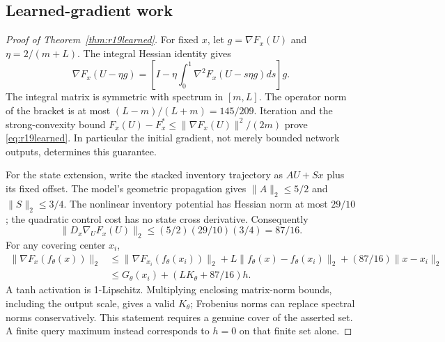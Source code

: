 \subsection{Learned-gradient work}
\begin{proof}[Proof of Theorem~\ref{thm:r19learned}]
For fixed $x$, let $g=\nabla F_x(U)$ and $\eta=2/(m+L)$. The integral Hessian identity gives
\[
 \nabla F_x(U-\eta g)=
 \left[I-\eta\int_0^1\nabla^2F_x(U-s\eta g)ds\right]g.
\]
The integral matrix is symmetric with spectrum in $[m,L]$. The operator norm of the bracket is at most $(L-m)/(L+m)=145/209$. Iteration and the strong-convexity bound $F_x(U)-F_x^*\leq\|\nabla F_x(U)\|^2/(2m)$ prove \eqref{eq:r19learned}. In particular the initial gradient, not merely bounded network outputs, determines this guarantee.

For the state extension, write the stacked inventory trajectory as $AU+Sx$ plus its fixed offset. The model's geometric propagation gives $\|A\|_2\leq5/2$ and $\|S\|_2\leq3/4$. The nonlinear inventory potential has Hessian norm at most $29/10$; the quadratic control cost has no state cross derivative. Consequently
\[
 \|D_x\nabla_UF_x(U)\|_2
 \leq(5/2)(29/10)(3/4)=87/16.
\]
For any covering center $x_i$,
\begin{align*}
 \|\nabla F_x(f_\theta(x))\|_2
 &\leq\|\nabla F_{x_i}(f_\theta(x_i))\|_2
       +L\|f_\theta(x)-f_\theta(x_i)\|_2
       +(87/16)\|x-x_i\|_2\\
 &\leq G_\theta(x_i)+(LK_\theta+87/16)h.
\end{align*}
A tanh activation is 1-Lipschitz. Multiplying enclosing matrix-norm bounds, including the output scale, gives a valid $K_\theta$; Frobenius norms can replace spectral norms conservatively. This statement requires a genuine cover of the asserted set. A finite query maximum instead corresponds to $h=0$ on that finite set alone.
\end{proof}
